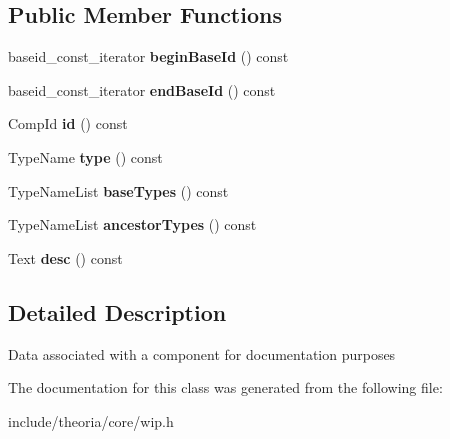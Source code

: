\subsection*{Public Member Functions}
\begin{DoxyCompactItemize}
\item 
\mbox{\label{classtheoria_1_1core_1_1ComponentData_ac066a43ccf51a3cc4e4e6b33eead20bf}} 
baseid\+\_\+const\+\_\+iterator {\bfseries begin\+Base\+Id} () const
\item 
\mbox{\label{classtheoria_1_1core_1_1ComponentData_adf1cc588e245d34e2a8d7cd44d9580fb}} 
baseid\+\_\+const\+\_\+iterator {\bfseries end\+Base\+Id} () const
\item 
\mbox{\label{classtheoria_1_1core_1_1ComponentData_a9b798845fc5503383db56c04e6d70080}} 
Comp\+Id {\bfseries id} () const
\item 
\mbox{\label{classtheoria_1_1core_1_1ComponentData_a4b2baf668db4d31d43898d9b8e7246c6}} 
Type\+Name {\bfseries type} () const
\item 
\mbox{\label{classtheoria_1_1core_1_1ComponentData_a37830d7e2cfdf40f37dde16e7be25f37}} 
Type\+Name\+List {\bfseries base\+Types} () const
\item 
\mbox{\label{classtheoria_1_1core_1_1ComponentData_a0f058607e3942fb7afa92b57cbe9247d}} 
Type\+Name\+List {\bfseries ancestor\+Types} () const
\item 
\mbox{\label{classtheoria_1_1core_1_1ComponentData_a2c78f474020e909d32fde895bd575cc6}} 
Text {\bfseries desc} () const
\end{DoxyCompactItemize}


\subsection{Detailed Description}
Data associated with a component for documentation purposes 

The documentation for this class was generated from the following file\+:\begin{DoxyCompactItemize}
\item 
include/theoria/core/wip.\+h\end{DoxyCompactItemize}
